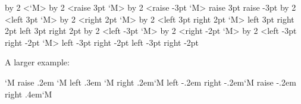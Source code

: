 \startlinecorrection
\bTABLE[align=middle,width=.33\textwidth]
    \bTR
        \bTD \showglyphs \multiply\glyphscale by 2 <{\darkgray \glyph                      `M}>\eTD
        \bTD \showglyphs \multiply\glyphscale by 2 <{\darkgray \glyph raise 3pt            `M}>\eTD
        \bTD \showglyphs \multiply\glyphscale by 2 <{\darkgray \glyph raise -3pt           `M}>\eTD
    \eTR
    \bTR[frame=off]
        \bTD \tttf            \eTD
        \bTD \tttf raise  3pt \eTD
        \bTD \tttf raise -3pt \eTD
    \eTR
    \bTR
        \bTD \showglyphs \multiply\glyphscale by 2 <{\darkgray \glyph left  3pt            `M}>\eTD
        \bTD \showglyphs \multiply\glyphscale by 2 <{\darkgray \glyph           right  2pt `M}>\eTD
        \bTD \showglyphs \multiply\glyphscale by 2 <{\darkgray \glyph left  3pt right  2pt `M}>\eTD
    \eTR
    \bTR[frame=off]
        \bTD \tttf left  3pt           \eTD
        \bTD \tttf           right  2pt\eTD
        \bTD \tttf left  3pt right  2pt\eTD
    \eTR
    \bTR
        \bTD \showglyphs \multiply\glyphscale by 2 <{\darkgray \glyph left -3pt            `M}>\eTD
        \bTD \showglyphs \multiply\glyphscale by 2 <{\darkgray \glyph           right -2pt `M}>\eTD
        \bTD \showglyphs \multiply\glyphscale by 2 <{\darkgray \glyph left -3pt right -2pt `M}>\eTD
    \eTR
    \bTR[frame=off]
        \bTD \tttf left -3pt            \eTD
        \bTD \tttf           right -2pt \eTD
        \bTD \tttf left -3pt right -2pt \eTD
    \eTR
\eTABLE
\stoplinecorrection

\page

A larger example:

\startbuffer
{}
\vl\glyph                        `M\vl\quad
\vl\glyph raise  .2em            `M\vl\quad
\vl\glyph left   .3em            `M\vl\quad
\vl\glyph             right  .2em`M\vl\quad
\vl\glyph left  -.2em right -.2em`M\vl\quad
\vl\glyph raise -.2em right  .4em`M\vl
\stopbuffer

\typebuffer

{\getbuffer}

\stoptitle

\stopdocument
